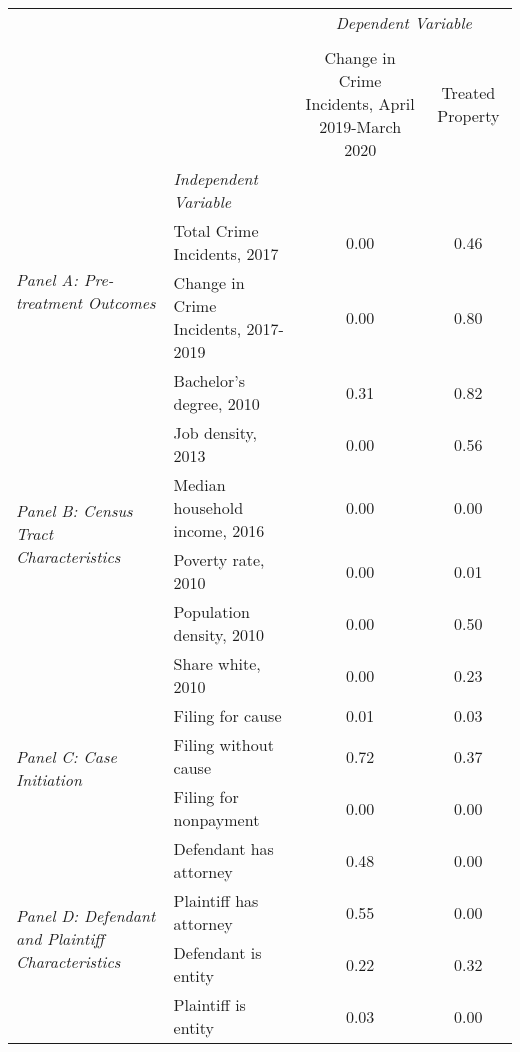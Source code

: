 \begin{tabular}{llcc}
\toprule
 &  & \multicolumn{2}{c}{\textit{Dependent Variable}} \\
\cline{3-4}
\\
 &  & Change in Crime Incidents, April 2019-March 2020 & Treated Property \\
 & \emph{Independent Variable} &  &  \\
\midrule
\multirow[c]{2}{3cm}{\textit{Panel A: Pre-treatment Outcomes}} & Total Crime Incidents, 2017 & 0.00 & 0.46 \\
 & Change in Crime Incidents, 2017-2019 & 0.00 & 0.80 \\
\cline{1-4}
\multirow[c]{6}{3cm}{\textit{Panel B: Census Tract Characteristics}} & Bachelor's degree, 2010 & 0.31 & 0.82 \\
 & Job density, 2013 & 0.00 & 0.56 \\
 & Median household income, 2016 & 0.00 & 0.00 \\
 & Poverty rate, 2010 & 0.00 & 0.01 \\
 & Population density, 2010 & 0.00 & 0.50 \\
 & Share white, 2010 & 0.00 & 0.23 \\
\cline{1-4}
\multirow[c]{3}{3cm}{\textit{Panel C: Case Initiation}} & Filing for cause & 0.01 & 0.03 \\
 & Filing without cause & 0.72 & 0.37 \\
 & Filing for nonpayment & 0.00 & 0.00 \\
\cline{1-4}
\multirow[c]{4}{3cm}{\textit{Panel D: Defendant and Plaintiff Characteristics}} & Defendant has attorney & 0.48 & 0.00 \\
 & Plaintiff has attorney & 0.55 & 0.00 \\
 & Defendant is entity & 0.22 & 0.32 \\
 & Plaintiff is entity & 0.03 & 0.00 \\
\cline{1-4}
\bottomrule
\end{tabular}
